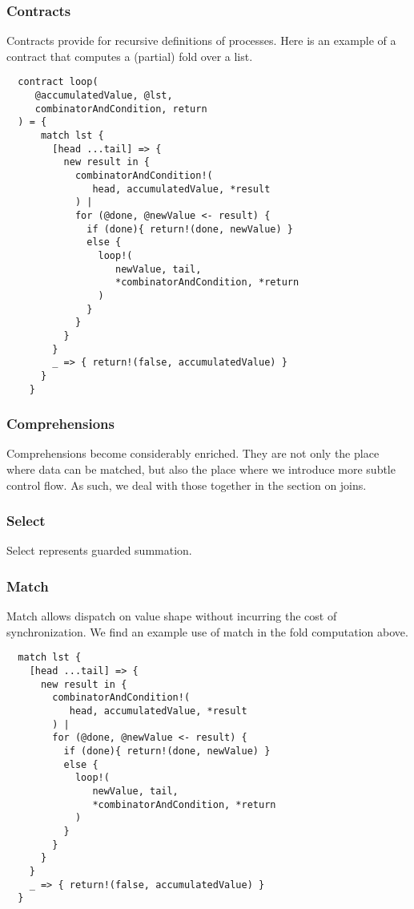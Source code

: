\subsubsection{Contracts}

Contracts provide for recursive definitions of processes. Here is an
example of a contract that computes a (partial) fold over a list.

\begin{lstlisting}
  contract loop(
     @accumulatedValue, @lst,
     combinatorAndCondition, return
  ) = {
      match lst {
        [head ...tail] => {
          new result in {
            combinatorAndCondition!(
               head, accumulatedValue, *result
            ) |
            for (@done, @newValue <- result) {
              if (done){ return!(done, newValue) }
              else {
                loop!(
                   newValue, tail,
                   *combinatorAndCondition, *return
                )
              }
            }
          }
        }
        _ => { return!(false, accumulatedValue) }
      }
    }
\end{lstlisting}

\subsubsection{Comprehensions}

Comprehensions become considerably enriched. They are not only the
place where data can be matched, but also the place where we introduce
more subtle control flow. As such, we deal with those together in the
section on joins.

\subsubsection{Select}

Select represents guarded summation.

\subsubsection{Match}

Match allows dispatch on value shape without incurring the cost of
synchronization. We find an example use of match in the fold
computation above.

\begin{lstlisting}
  match lst {
    [head ...tail] => {
      new result in {
        combinatorAndCondition!(
           head, accumulatedValue, *result
        ) |
        for (@done, @newValue <- result) {
          if (done){ return!(done, newValue) }
          else {
            loop!(
               newValue, tail,
               *combinatorAndCondition, *return
            )
          }
        }
      }
    }
    _ => { return!(false, accumulatedValue) }
  }
\end{lstlisting}

